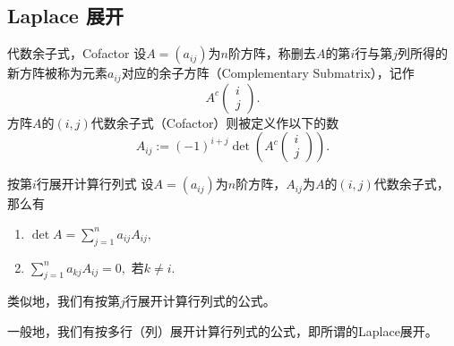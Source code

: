 
\subsection{Laplace 展开}


\begin{frame}


\begin{block}{代数余子式，Cofactor}
设$A=(a_{ij})$为$n$阶方阵，称删去$A$的第$i$行与第$j$列所得的新方阵被称为元素$a_{ij}$对应的余子方阵（Complementary Submatrix），记作
\[A^c\begin{pmatrix} i \\ j \end{pmatrix}.\]
方阵$A$的$(i,j)$代数余子式（Cofactor）则被定义作以下的数
\[A_{ij} := (-1)^{i+j} \det\left( A^c\begin{pmatrix} i \\ j \end{pmatrix} \right).\]
\end{block}

\end{frame}


\begin{frame}

\begin{block}{按第$i$行展开计算行列式}
设$A=(a_{ij})$为$n$阶方阵，$A_{ij}$为$A$的$(i,j)$代数余子式，那么有\pause
\begin{enumerate}
\item \(\displaystyle \det A = \sum\limits_{j = 1}^n a_{ij}A_{ij},\)
\item \(\displaystyle \sum\limits_{j = 1}^n a_{kj}A_{ij} = 0,\) 若$k\neq i$.
\end{enumerate}

\pause

类似地，我们有按第$j$行展开计算行列式的公式。
\end{block}

\vspace{1em}
\pause

一般地，我们有按多行（列）展开计算行列式的公式，即所谓的Laplace展开。

\end{frame}

